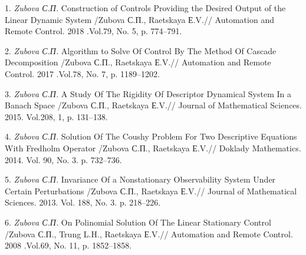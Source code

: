 1. {\it  Zubova С.П.} Construction of Controls Providing the Desired Output of the Linear Dynamic System /Zubova С.П., Raetskaya Е.V.// Automation and Remote Control. 2018 .Vol.79, No. 5, p. 774--791.

2. {\it Zubova С.П.} Algorithm to Solve Of Control By The Method Of Cascade Decomposition /Zubova С.П., Raetskaya Е.V.// Automation and Remote Control. 2017 .Vol.78, No. 7, p. 1189--1202.

3. {\it Zubova С.П.} A Study Of The Rigidity Of Descriptor Dynamical System In a Banach Space /Zubova С.П., Raetskaya Е.V.// Journal of Mathematical Sciences. 2015. Vol.208, 1, p. 131--138.


4. {\it Zubova С.П.} Solution Of The Coushy Problem For Two Descriptive Equations With Fredholm Operator /Zubova С.П., Raetskaya Е.V.//
Doklady Mathematics. 2014. Vol. 90, No. 3. p. 732--736.

5. {\it Zubova С.П.} Invariance Of a Nonstationary Observability System Under Certain Perturbations /Zubova С.П., Raetskaya Е.V.// Journal of Mathematical Sciences. 2013. Vol. 188, No. 3. p. 218--226.

6. {\it Zubova С.П.} On Polinomial Solution Of The Linear Stationary Control /Zubova С.П., Trung L.H., Raetskaya Е.V.// Automation and Remote Control. 2008 .Vol.69, No. 11, p. 1852--1858.
